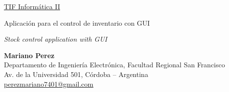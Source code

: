 \begin{titlepage}
\begin{center}
\Huge{\underline{TIF Informática II}\par}
\vspace{1cm}
\LARGE{Aplicación para el control de inventario con GUI\par}
\vspace{0.5cm}
\LARGE{\emph{Stock control application with GUI}\par}
\end{center}
\vspace{2cm}
\normalsize{}
\textbf{Mariano Perez}\\
Departamento de Ingeniería Electrónica, Facultad Regional San Francisco\\
Av. de la Universidad 501, Córdoba – Argentina\\
\href{mailto:perezmariano7401@gmail.com}{perezmariano7401@gmail.com}
\vfill
\end{titlepage}
